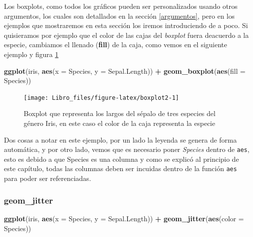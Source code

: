 \documentclass[]{book}
\newenvironment{Shaded}{\begin{snugshade}}{\end{snugshade}}
\newcommand{\DataTypeTok}[1]{\textcolor[rgb]{0.13,0.29,0.53}{#1}}
\newcommand{\KeywordTok}[1]{\textcolor[rgb]{0.13,0.29,0.53}{\textbf{#1}}}
\newcommand{\NormalTok}[1]{#1}
\newcommand{\OperatorTok}[1]{\textcolor[rgb]{0.81,0.36,0.00}{\textbf{#1}}}
\newcommand{\StringTok}[1]{\textcolor[rgb]{0.31,0.60,0.02}{#1}}
\begin{document}
Los boxplots, como todos los gráficos pueden ser personalizados usando
otros argumentos, los cuales son detallados en la sección
\ref{argumentos}, pero en los ejemplos que mostraremos en esta sección
los iremos introduciendo de a poco. Si quisieramos por ejemplo que el
color de las cajas del \emph{boxplot} fuera deacuerdo a la especie,
cambiamos el llenado (\textbf{fill}) de la caja, como vemos en el
siguiente ejemplo y figura \ref{fig:boxplot2}

\begin{Shaded}
\begin{Highlighting}[]
\KeywordTok{ggplot}\NormalTok{(iris, }\KeywordTok{aes}\NormalTok{(}\DataTypeTok{x =}\NormalTok{ Species, }\DataTypeTok{y =}\NormalTok{ Sepal.Length)) }\OperatorTok{+}\StringTok{ }\KeywordTok{geom_boxplot}\NormalTok{(}\KeywordTok{aes}\NormalTok{(}\DataTypeTok{fill =}\NormalTok{ Species))}
\end{Highlighting}
\end{Shaded}

\begin{figure}

{\centering \texttt{[image: Libro\_files/figure-latex/boxplot2-1]} 

}

\caption{Boxplot que representa los largos del sépalo de tres especies del género Iris, en este caso el color de la caja representa la especie}\label{fig:boxplot2}
\end{figure}

Dos cosas a notar en este ejemplo, por un lado la leyenda se genera de
forma automática, y por otro lado, vemos que es necesario poner
\emph{Species} dentro de \texttt{aes}, esto es debido a que Species es
una columna y como se explicó al principio de este capítulo, todas las
columnas deben ser incuidas dentro de la función \texttt{aes} para poder
ser referenciadas.

\hypertarget{geom_jitter}{%
\subsubsection{geom\_jitter}\label{geom_jitter}}

\begin{Shaded}
\begin{Highlighting}[]
\KeywordTok{ggplot}\NormalTok{(iris, }\KeywordTok{aes}\NormalTok{(}\DataTypeTok{x =}\NormalTok{ Species, }\DataTypeTok{y =}\NormalTok{ Sepal.Length)) }\OperatorTok{+}\StringTok{ }\KeywordTok{geom_jitter}\NormalTok{(}\KeywordTok{aes}\NormalTok{(}\DataTypeTok{color =}\NormalTok{ Species))}
\end{Highlighting}
\end{Shaded}
\end{document}
